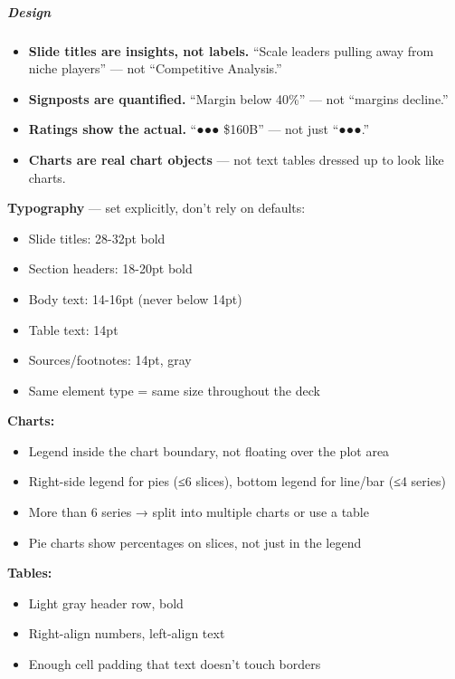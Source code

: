 \documentclass[11pt]{article}
\begin{document}
\subparagraph{Design}\mbox{}\par

\begin{itemize}[leftmargin=*,itemsep=2pt,topsep=2pt]
\item {} \textbf{Slide titles are insights, not labels.} ``Scale leaders pulling away from niche players'' — not ``Competitive Analysis.''
\item {} \textbf{Signposts are quantified.} ``Margin below 40\%'' — not ``margins decline.''
\item {} \textbf{Ratings show the actual.} ``●●● \$160B'' — not just ``●●●.''
\item {} \textbf{Charts are real chart objects} — not text tables dressed up to look like charts.
\end{itemize}

\textbf{Typography} — set explicitly, don't rely on defaults:

\begin{itemize}[leftmargin=*,itemsep=2pt,topsep=2pt]
\item {} Slide titles: 28-32pt bold
\item {} Section headers: 18-20pt bold
\item {} Body text: 14-16pt (never below 14pt)
\item {} Table text: 14pt
\item {} Sources/footnotes: 14pt, gray
\item {} Same element type = same size throughout the deck
\end{itemize}

\textbf{Charts:}

\begin{itemize}[leftmargin=*,itemsep=2pt,topsep=2pt]
\item {} Legend inside the chart boundary, not floating over the plot area
\item {} Right-side legend for pies (≤6 slices), bottom legend for line/bar (≤4 series)
\item {} More than 6 series → split into multiple charts or use a table
\item {} Pie charts show percentages on slices, not just in the legend
\end{itemize}

\textbf{Tables:}

\begin{itemize}[leftmargin=*,itemsep=2pt,topsep=2pt]
\item {} Light gray header row, bold
\item {} Right-align numbers, left-align text
\item {} Enough cell padding that text doesn't touch borders
\end{itemize}
\end{document}
